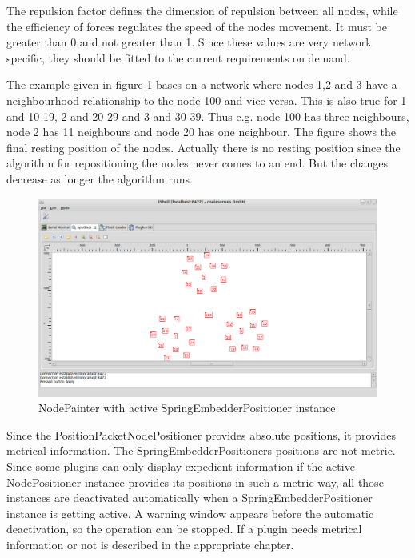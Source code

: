 The repulsion factor defines the dimension of repulsion between all nodes, while the efficiency of forces regulates
the speed of the nodes movement. It must be greater than 0 and not greater than 1. Since these values are very
network specific, they should be fitted to the current requirements on demand.

The example given in figure \ref{pic:sep} bases on a network where nodes 1,2 and 3 have a neighbourhood relationship
to the node 100 and vice versa. This is also true for 1 and 10-19, 2 and 20-29 and 3 and 30-39. Thus e.g. node 100 has
three neighbours, node 2 has 11 neighbours and node 20 has one neighbour. The figure shows the final resting
position of the nodes. Actually there is no resting position since the algorithm for repositioning the nodes
never comes to an end. But the changes decrease as longer the algorithm runs.

\begin{figure}[htb]
  \begin{center}
    \includegraphics[width=13.2cm]{./pics/springembedderpositioner}
    \caption{NodePainter with active SpringEmbedderPositioner instance}
    \label{pic:sep}
  \end{center}
\end{figure}

Since the PositionPacketNodePositioner provides absolute positions, it provides metrical information.
The SpringEmbedderPositioners positions are not metric. Since some plugins
can only display expedient information if the active NodePositioner instance provides its positions
in such a metric way, all those instances are deactivated automatically when a SpringEmbedderPositioner
instance is getting active. A warning window appears before the automatic deactivation, so the operation
can be stopped. If a plugin needs metrical information or not is described in the appropriate chapter.



